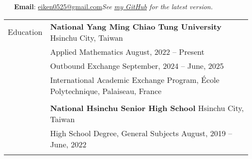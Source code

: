 \documentclass[letterpaper, 11pt]{article}
\begin{document}


\vspace{0.5cm} 
\noindent\:\ \ \ \textbf{Email}: \href{mailto:eiken0525@gmail.com}{eiken0525@gmail.com}\hfill \textit{\footnotesize See \href{https://github.com/eiken59/CV/blob/main/eiken59_CV.pdf}{my GitHub} for the latest version.\ \ \ \ \,}


\setlength{\tabcolsep}{8pt}
\vspace{-1.5em}
\begin{center}
    \begin{longtable}{p{0.74in}p{5.95in}}

        
        
        
        \textcolor{OliveGreen}{Education} 
        & \textbf{National Yang Ming Chiao Tung University} \hfill Hsinchu City, Taiwan \\ 
        & Applied Mathematics \hfill August, 2022 -- Present \\
        & Outbound Exchange \hfill September, 2024 -- June, 2025\\
        & \qquad International Academic Exchange Program, \'Ecole Polytechnique, Palaiseau, France \\
        & \\
        
        & \textbf{National Hsinchu Senior High School} \hfill Hsinchu City, Taiwan \\
        & High School Degree, General Subjects \hfill August, 2019 -- June, 2022\\
        & \\
        
        

\end{longtable}
\end{center}
\end{document}
